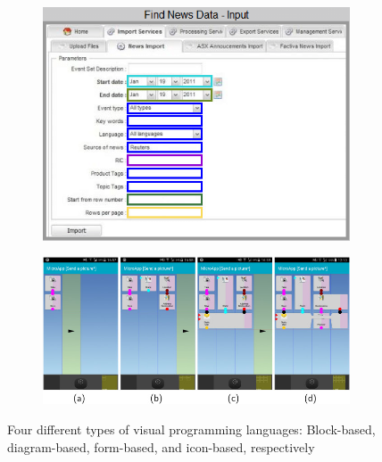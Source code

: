 \begin{figure}
\begin{subfigure}[b]{0.45\linewidth}
\end{subfigure}%
\\
\begin{subfigure}[c]{0.45\linewidth}
  \centering
  \graphicspath{{../../assets/images/background/vpl/}}
  \includegraphics[width=\linewidth]{form-based.png}
  \caption{}\label{fig:vpl-types:3}
\end{subfigure}%
\qquad %
\begin{subfigure}[d]{0.45\linewidth}
  \centering
  \graphicspath{{../../assets/images/background/vpl/}}
  \includegraphics[width=\linewidth]{icon-based.jpg}
  \caption{}\label{fig:vpl-types:4}
\end{subfigure}%
\caption[Types of \ac{vpl}s]{Four different types of visual programming languages: Block-based, diagram-based, form-based, and icon-based, respectively}%
\label{fig:vpl-types}
\end{figure}

